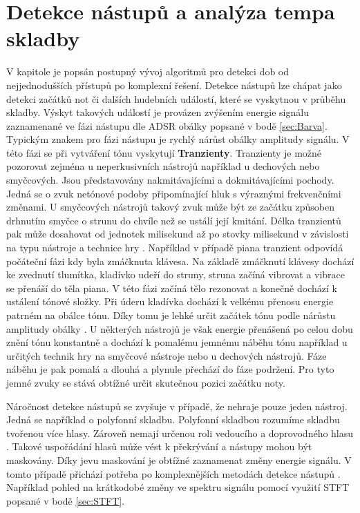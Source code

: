 
\section{Detekce nástupů a analýza tempa skladby} \label{sec:Detekce_tempa}
V kapitole je popsán postupný vývoj algoritmů pro detekci dob od nejjednodušších přístupů po komplexní řešení. Detekce nástupů lze chápat jako detekci začátků not či dalších hudebních událostí, které se vyskytnou v průběhu skladby. Výskyt takových událostí je provázen zvýšením energie signálu zaznamenané ve fázi nástupu dle \acs{ADSR} obálky popsané v bodě \ref{sec:Barva}. Typickým znakem pro fázi nástupu je rychlý nárůst obálky amplitudy signálu.
V této fázi se při vytváření tónu vyskytují \textbf{Tranzienty}. Tranzienty je možné pozorovat zejména u neperkusivních nástrojů například u dechových nebo smyčcových. Jsou představovány nakmitávajícími a dokmitávajícími pochody. Jedná se o zvuk netónové podoby připomínající hluk s výraznými frekvenčními změnami. U smyčcových nástrojů takový zvuk může být ze začátku způsoben drhnutím smyčce o strunu do chvíle než se ustálí její kmitání. Délka tranzientů pak může dosahovat od jednotek milisekund až po stovky milisekund v závislosti na typu nástroje a technice hry \cite{syrový2013hudební}. Například v případě piana tranzient odpovídá počáteční fázi kdy byla zmáčknuta klávesa. Na základě zmáčknutí klávesy dochází ke zvednutí tlumítka, kladívko udeří do struny, struna začíná vibrovat a vibrace se přenáší do těla piana. V této fázi začíná tělo rezonovat a konečně dochází k ustálení tónové složky. Při úderu kladívka dochází k velkému přenosu energie patrném na obálce tónu. Díky tomu je lehké určit začátek tónu podle nárůstu amplitudy obálky \cite{fundamental_of_music_processing}. U některých nástrojů je však energie přenášená po celou dobu znění tónu konstantně a dochází k pomalému jemnému náběhu tónu například u určitých technik hry na smyčcové nástroje nebo u dechových nástrojů. Fáze náběhu je pak pomalá a dlouhá a plynule přechází do fáze podržení. Pro tyto jemné zvuky se stává obtížné určit skutečnou pozici začátku noty.

Náročnost detekce nástupů se zvyšuje v případě, že nehraje pouze jeden nástroj. Jedná se například o polyfonní skladbu. Polyfonní skladbou rozumíme skladbu tvořenou více hlasy.
Zároveň nemají určenou roli vedoucího a doprovodného hlasu \cite{6155601}.
Takové uspořádání hlasů může vést k překrývání a nástupy mohou být maskovány. Díky jevu maskování je obtížné zaznamenat změny energie signálu. V tomto případě přichází potřeba po komplexnějších metodách detekce nástupů \cite{fundamental_of_music_processing}. Například pohled na krátkodobé změny ve spektru signálu pomocí využití \acs{STFT} popsané v bodě \ref{sec:STFT}.

